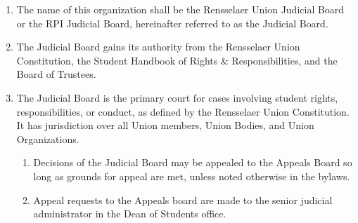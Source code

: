 

\begin{enumerate}
\item 	The name of this organization shall be the Rensselaer Union Judicial Board or the RPI Judicial Board, hereinafter referred to as the Judicial Board. 
\item The Judicial Board gains its authority from the Rensselaer Union Constitution, the Student Handbook of Rights \& Responsibilities, and the Board of Trustees. 
\item  The Judicial Board is the primary court for cases involving student rights, responsibilities, or conduct, as defined by the Rensselaer Union Constitution. It has jurisdiction over all Union members, Union Bodies, and Union Organizations.
\begin{enumerate}
    \item Decisions of the Judicial Board may be appealed to the Appeals Board so long as grounds for appeal are met, unless noted otherwise in the bylaws.
    \item Appeal requests to the Appeals board are made to the senior judicial administrator in the Dean of Students office. 
\end{enumerate}
\end{enumerate}


